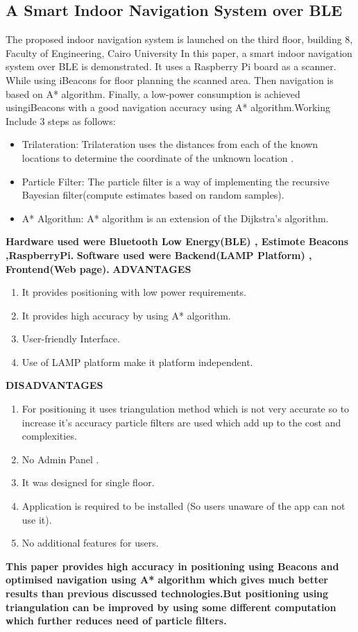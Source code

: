 \documentclass[a4paper, 12pt]{article}
\begin{document}
\subsection{A Smart Indoor Navigation System over BLE}
\hspace{1cm}  
The proposed indoor navigation system is launched on the third ﬂoor, building 8, Faculty of Engineering, Cairo University In this paper, a smart indoor navigation system over BLE is demonstrated. It uses a Raspberry Pi board as a scanner. While using iBeacons for ﬂoor planning the scanned area. Then navigation is based on A* algorithm. Finally, a low-power consumption is achieved usingiBeacons with a good navigation accuracy using A* algorithm.Working Include 3 steps as follows:
\begin{itemize}
	\item	Trilateration: Trilateration uses the distances from each of the known locations to determine the coordinate of the unknown location .
	\item Particle Filter: The particle ﬁlter is a way of implementing the recursive Bayesian ﬁlter(compute estimates based on random samples). 
	\item	A* Algorithm: A* algorithm is an extension of the Dijkstra’s algorithm.	
\end{itemize}
\textbf{Hardware used were Bluetooth Low Energy(BLE) , Estimote Beacons ,RaspberryPi.}
\linebreak
\textbf{Software used were Backend(LAMP Platform) , Frontend(Web page).}
\textbf{ADVANTAGES}
\begin{enumerate}
	\item	It provides positioning with low power requirements.
	\item	It provides high accuracy by using A* algorithm.
	\item	User-friendly Interface.
	\item  Use of LAMP platform make it platform independent.	
\end{enumerate}
\textbf{DISADVANTAGES}
\begin{enumerate}
	\item	For positioning it uses triangulation method which is not very accurate so to increase it’s accuracy particle filters are used which add up to the cost and complexities.
	\item	No Admin Panel .
	\item It was designed for single floor.
	\item Application is required to be installed (So users unaware of the app can not use it).
	\item	No additional features for users.		
\end{enumerate}
\textbf{This paper provides high accuracy in positioning using Beacons and optimised navigation using A* algorithm which gives much better results than previous discussed technologies.But positioning using triangulation can be improved by using some different computation which further reduces need of particle filters.}
\end{document}
